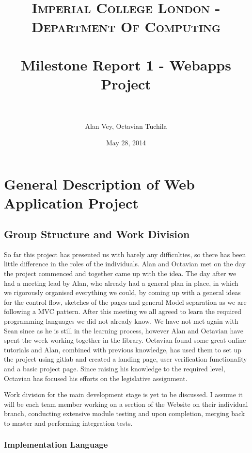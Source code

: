 \documentclass[paper=a4, fontsize=11pt]{scrartcl} %
\title{	
\normalfont \normalsize 
\textsc{Imperial College London - Department Of Computing} \\ [25pt] %
\horrule{0.5pt} \\[0.4cm] %
\huge Milestone Report 1 - Webapps Project\\ %
\horrule{2pt} \\[0.5cm] %
}
\author{Alan Vey, Octavian Tuchila} %
\date{\normalsize May 28, 2014} %
\numberwithin{equation}{section} %
\numberwithin{figure}{section} %
\numberwithin{table}{section} %
\begin{document}
\maketitle %


\section{General Description of Web Application Project}

\subsection{Group Structure and Work Division}

So far this project has presented us with barely any difficulties, so there has been little difference in the roles of the individuals. Alan and Octavian met on the day the project commenced and together came up with the idea. The day after we had a meeting lead by Alan, who already had a general plan in place, in which we rigorously organised everything we could, by coming up with a general ideas for the control flow, sketches of the pages and general Model separation as we are following a MVC pattern. After this meeting we all agreed to learn the required programming languages we did not already know. We have not met again with Sean since as he is still in the learning process, however Alan and Octavian have spent the week working together in the library. Octavian found some great online tutorials and Alan, combined with previous knowledge, has used them to set up the project using gitlab and created a landing page, user verification functionality and a basic project page. Since raising his knowledge to the required level, Octavian has focused his efforts on the legislative assignment. \newline

Work division for the main development stage is yet to be discussed. I assume it will be each team member working on a section of the Website on their individual branch, conducting extensive module testing and upon completion, merging back to master and performing integration tests.\clearpage



\subsubsection{Implementation Language}
\end{document}

